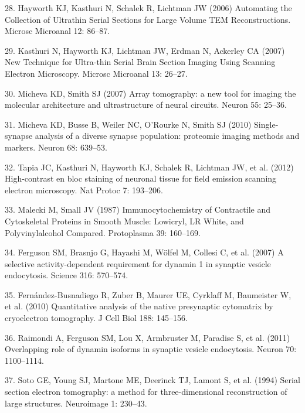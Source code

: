 \documentclass{article}
\begin{document}
\begin{hangpars}
28. Hayworth KJ, Kasthuri N, Schalek R, Lichtman JW (2006) Automating the Collection of Ultrathin Serial Sections for Large Volume TEM Reconstructions. Microsc Microanal 12: 86–87.

29. Kasthuri N, Hayworth KJ, Lichtman JW, Erdman N, Ackerley CA (2007) New Technique for Ultra-thin Serial Brain Section Imaging Using Scanning Electron Microscopy. Microsc Microanal 13: 26–27.

30. Micheva KD, Smith SJ (2007) Array tomography: a new tool for imaging the molecular architecture and ultrastructure of neural circuits. Neuron 55: 25–36.

31. Micheva KD, Busse B, Weiler NC, O’Rourke N, Smith SJ (2010) Single-synapse analysis of a diverse synapse population: proteomic imaging methods and markers. Neuron 68: 639–53.

32. Tapia JC, Kasthuri N, Hayworth KJ, Schalek R, Lichtman JW, et al. (2012) High-contrast en bloc staining of neuronal tissue for field emission scanning electron microscopy. Nat Protoc 7: 193–206.

33. Malecki M, Small JV (1987) Immunocytochemistry of Contractile and Cytoskeletal Proteins in Smooth Muscle: Lowicryl, LR White, and Polyvinylalcohol Compared. Protoplasma 39: 160–169.

34. Ferguson SM, Brasnjo G, Hayashi M, Wölfel M, Collesi C, et al. (2007) A selective activity-dependent requirement for dynamin 1 in synaptic vesicle endocytosis. Science 316: 570–574.

35. Fernández-Busnadiego R, Zuber B, Maurer UE, Cyrklaff M, Baumeister W, et al. (2010) Quantitative analysis of the native presynaptic cytomatrix by cryoelectron tomography. J Cell Biol 188: 145–156.

36. Raimondi A, Ferguson SM, Lou X, Armbruster M, Paradise S, et al. (2011) Overlapping role of dynamin isoforms in synaptic vesicle endocytosis. Neuron 70: 1100–1114.

37. Soto GE, Young SJ, Martone ME, Deerinck TJ, Lamont S, et al. (1994) Serial section electron tomography: a method for three-dimensional reconstruction of large structures. Neuroimage 1: 230–43.
\end{hangpars}
\end{document}
